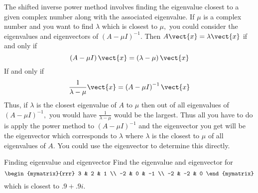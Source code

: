 The shifted inverse power method involves finding the eigenvalue closest to
a given complex number along with the associated eigenvalue. If $\mu $ is a
complex number and you want to find $\lambda $ which is closest to $\mu ,$
you could consider the eigenvalues and eigenvectors of $\left( A-\mu
I\right) ^{-1}$. Then $A\vect{x}=\lambda \vect{x}$ if and only if 
\begin{equation*}
\left( A-\mu I\right) \vect{x}=\left( \lambda -\mu \right) \vect{x}
\end{equation*}
If and only if 
\begin{equation*}
\frac{1}{\lambda -\mu }\vect{x}=\left( A-\mu I\right) ^{-1}\vect{x}
\end{equation*}
Thus, if $\lambda $ is the closest eigenvalue of $A$ to $\mu $ then out of
all eigenvalues of $\left( A-\mu I\right) ^{-1},$ you would have $\frac{1}{
\lambda -\mu }$ would be the largest. Thus all you have to do is apply the
power method to $\left( A-\mu I\right) ^{-1}$ and the eigenvector you get
will be the eigenvector which corresponds to $\lambda $ where $\lambda $ is
the closest to $\mu $ of all eigenvalues of $A$. You could use the
eigenvector to determine this directly.

\begin{example}{Finding eigenvalue and eigenvector}{}
Find the eigenvalue and eigenvector for 
\begin{equation*}
\begin{mymatrix}{rrr}
3 & 2 & 1 \\ 
-2 & 0 & -1 \\ 
-2 & -2 & 0
\end{mymatrix}
\end{equation*}
which is closest to $.9+.9i$.
\end{example}

